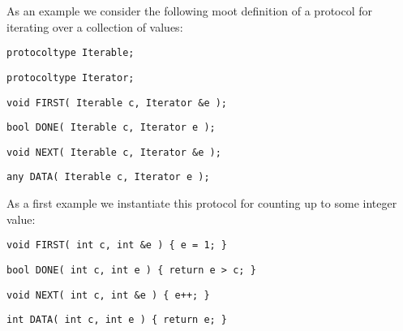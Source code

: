 \documentclass{sigplanconf}
\begin{document}
As an example we consider the following {\sc moot}
definition of a protocol for iterating over a collection of values:
\begin{samepage}
\begin{verbatim}
protocoltype Iterable;
\end{verbatim}
\end{samepage}
\begin{samepage}
\begin{verbatim}
protocoltype Iterator;
\end{verbatim}
\end{samepage}
\begin{samepage}
\begin{verbatim}
void FIRST( Iterable c, Iterator &e );
\end{verbatim}
\end{samepage}
\begin{samepage}
\begin{verbatim}
bool DONE( Iterable c, Iterator e );
\end{verbatim}
\end{samepage}
\begin{samepage}
\begin{verbatim}
void NEXT( Iterable c, Iterator &e );
\end{verbatim}
\end{samepage}
\begin{samepage}
\begin{verbatim}
any DATA( Iterable c, Iterator e );
\end{verbatim}
\end{samepage}
As a first example we instantiate this protocol for counting up to
some integer value:
\begin{samepage}
\begin{verbatim}
void FIRST( int c, int &e ) { e = 1; }
\end{verbatim}
\end{samepage}
\begin{samepage}
\begin{verbatim}
bool DONE( int c, int e ) { return e > c; }
\end{verbatim}
\end{samepage}
\begin{samepage}
\begin{verbatim}
void NEXT( int c, int &e ) { e++; }
\end{verbatim}
\end{samepage}
\begin{samepage}
\begin{verbatim}
int DATA( int c, int e ) { return e; }
\end{verbatim}
\end{samepage}
\end{document}
